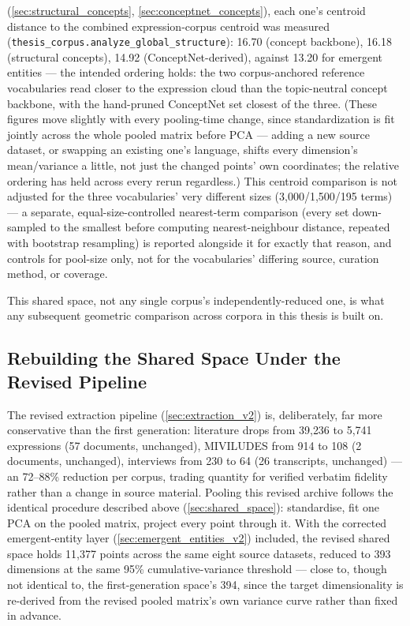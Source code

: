 (\ref{sec:structural_concepts}, \ref{sec:conceptnet_concepts}), each one's centroid distance to the combined expression-corpus centroid was measured (\texttt{thesis\_corpus.analyze\_global\_structure}): 16.70 (concept backbone), 16.18 (structural concepts), 14.92 (ConceptNet-derived), against 13.20 for emergent entities — the intended ordering holds: the two corpus-anchored reference vocabularies read closer to the expression cloud than the topic-neutral concept backbone, with the hand-pruned ConceptNet set closest of the three. (These figures move slightly with every pooling-time change, since standardization is fit jointly across the whole pooled matrix before PCA — adding a new source dataset, or swapping an existing one's language, shifts every dimension's mean/variance a little, not just the changed points' own coordinates; the relative ordering has held across every rerun regardless.) This centroid comparison is not adjusted for the three vocabularies' very different sizes (3,000/1,500/195 terms) — a separate, equal-size-controlled nearest-term comparison (every set down-sampled to the smallest before computing nearest-neighbour distance, repeated with bootstrap resampling) is reported alongside it for exactly that reason, and controls for pool-size only, not for the vocabularies' differing source, curation method, or coverage.

This shared space, not any single corpus's independently-reduced one, is what any subsequent geometric comparison across corpora in this thesis is built on.

\subsection{Rebuilding the Shared Space Under the Revised Pipeline}\label{sec:shared_space_v2}

The revised extraction pipeline (\ref{sec:extraction_v2}) is, deliberately, far more conservative than the first generation: literature drops from 39{,}236 to 5{,}741 expressions (57 documents, unchanged), MIVILUDES from 914 to 108 (2 documents, unchanged), interviews from 230 to 64 (26 transcripts, unchanged) — an 72--88\% reduction per corpus, trading quantity for verified verbatim fidelity rather than a change in source material. Pooling this revised archive follows the identical procedure described above (\ref{sec:shared_space}): standardise, fit one PCA on the pooled matrix, project every point through it. With the corrected emergent-entity layer (\ref{sec:emergent_entities_v2}) included, the revised shared space holds 11{,}377 points across the same eight source datasets, reduced to 393 dimensions at the same 95\% cumulative-variance threshold — close to, though not identical to, the first-generation space's 394, since the target dimensionality is re-derived from the revised pooled matrix's own variance curve rather than fixed in advance.

